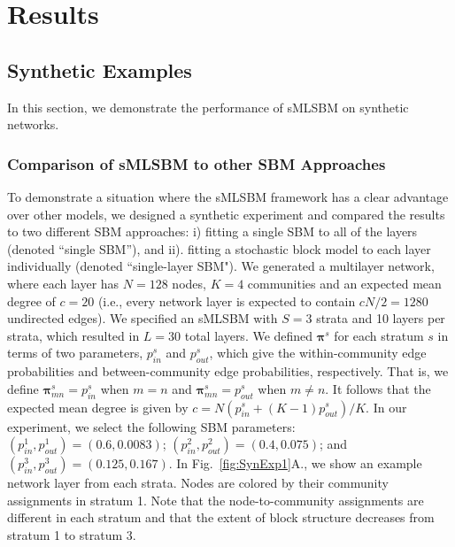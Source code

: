 {\section{Results}

\subsection{Synthetic Examples}
In this section, we demonstrate the performance of sMLSBM on synthetic networks.
\subsubsection{Comparison of sMLSBM to other SBM Approaches}\label{sec:SBM1}
To demonstrate a situation where the sMLSBM framework has a clear advantage over other models, we designed a synthetic experiment and compared the results to two different SBM approaches: i) fitting a single SBM to all of the layers (denoted ``single SBM''), and ii). fitting a stochastic block model to each layer individually (denoted ``single-layer SBM"). We generated a multilayer network, where each layer has $N=128$ nodes, $K=4$ communities and an expected mean degree of $c=20$ (i.e., every network layer is expected to contain $cN/2=1280$ undirected edges). We specified an sMLSBM with $S=3$ strata and 10 layers per strata, which resulted in $L=30$ total layers. We defined ${\boldsymbol \pi}^{s}$ for each stratum $s$ in terms of two parameters, $p_{in}^s$ and $p_{out}^s$, which give the within-community edge probabilities and between-community edge probabilities, respectively. That is, we define ${\boldsymbol \pi}^s_{mn}=p_{in}^s$ when $m=n$ and ${\boldsymbol \pi}^s_{mn}=p_{out}^s$ when $m\not=n$. It follows that the expected mean degree is given by $c=N(p_{in}^s + (K-1)p_{out}^s)/K$.
In our experiment, we select the following SBM parameters: $(p_{in}^1,p_{out}^1)=(0.6,0.0083)$; $(p_{in}^2,p_{out}^2)=(0.4,0.075)$; and $(p_{in}^3,p_{out}^3)=(0.125,0.167)$. 
In Fig.~\ref{fig:SynExp1}A., we show an example network layer from each strata. Nodes are colored by their community assignments in stratum 1. Note that the node-to-community assignments are different in each stratum and that the extent of block structure decreases from stratum 1 to stratum 3.


}
